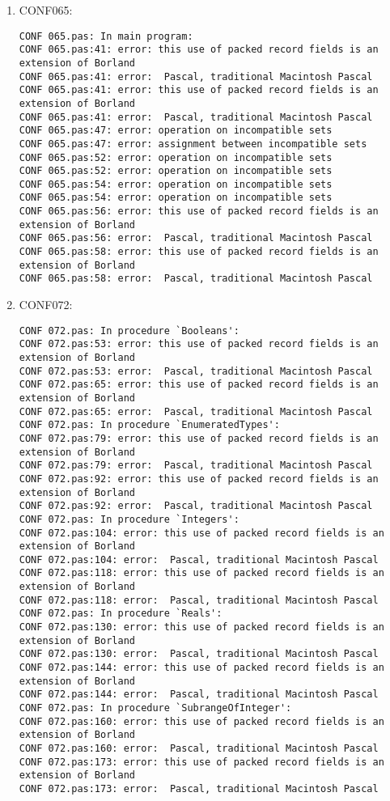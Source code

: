 \documentclass[a4paper]{article}
\begin{document}
\begin{enumerate}
    \item CONF065:
        \begin{small}\begin{verbatim}
CONF 065.pas: In main program:
CONF 065.pas:41: error: this use of packed record fields is an extension of Borland
CONF 065.pas:41: error:  Pascal, traditional Macintosh Pascal
CONF 065.pas:41: error: this use of packed record fields is an extension of Borland
CONF 065.pas:41: error:  Pascal, traditional Macintosh Pascal
CONF 065.pas:47: error: operation on incompatible sets
CONF 065.pas:47: error: assignment between incompatible sets
CONF 065.pas:52: error: operation on incompatible sets
CONF 065.pas:52: error: operation on incompatible sets
CONF 065.pas:54: error: operation on incompatible sets
CONF 065.pas:54: error: operation on incompatible sets
CONF 065.pas:56: error: this use of packed record fields is an extension of Borland
CONF 065.pas:56: error:  Pascal, traditional Macintosh Pascal
CONF 065.pas:58: error: this use of packed record fields is an extension of Borland
CONF 065.pas:58: error:  Pascal, traditional Macintosh Pascal
        \end{verbatim}\end{small}

    \item CONF072:
        \begin{small}\begin{verbatim}
CONF 072.pas: In procedure `Booleans':
CONF 072.pas:53: error: this use of packed record fields is an extension of Borland
CONF 072.pas:53: error:  Pascal, traditional Macintosh Pascal
CONF 072.pas:65: error: this use of packed record fields is an extension of Borland
CONF 072.pas:65: error:  Pascal, traditional Macintosh Pascal
CONF 072.pas: In procedure `EnumeratedTypes':
CONF 072.pas:79: error: this use of packed record fields is an extension of Borland
CONF 072.pas:79: error:  Pascal, traditional Macintosh Pascal
CONF 072.pas:92: error: this use of packed record fields is an extension of Borland
CONF 072.pas:92: error:  Pascal, traditional Macintosh Pascal
CONF 072.pas: In procedure `Integers':
CONF 072.pas:104: error: this use of packed record fields is an extension of Borland
CONF 072.pas:104: error:  Pascal, traditional Macintosh Pascal
CONF 072.pas:118: error: this use of packed record fields is an extension of Borland
CONF 072.pas:118: error:  Pascal, traditional Macintosh Pascal
CONF 072.pas: In procedure `Reals':
CONF 072.pas:130: error: this use of packed record fields is an extension of Borland
CONF 072.pas:130: error:  Pascal, traditional Macintosh Pascal
CONF 072.pas:144: error: this use of packed record fields is an extension of Borland
CONF 072.pas:144: error:  Pascal, traditional Macintosh Pascal
CONF 072.pas: In procedure `SubrangeOfInteger':
CONF 072.pas:160: error: this use of packed record fields is an extension of Borland
CONF 072.pas:160: error:  Pascal, traditional Macintosh Pascal
CONF 072.pas:173: error: this use of packed record fields is an extension of Borland
CONF 072.pas:173: error:  Pascal, traditional Macintosh Pascal
        \end{verbatim}\end{small}


\end{enumerate}
\end{document}
